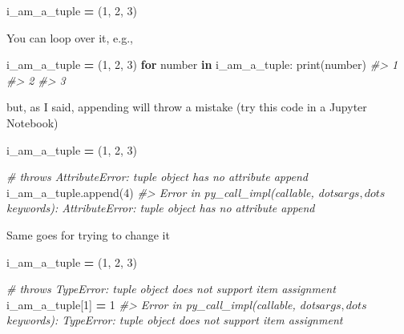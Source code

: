 \documentclass[
]{book}
\newenvironment{Shaded}{\begin{snugshade}}{\end{snugshade}}
\newcommand{\BuiltInTok}[1]{#1}
\newcommand{\CommentTok}[1]{\textcolor[rgb]{0.56,0.35,0.01}{\textit{#1}}}
\newcommand{\ControlFlowTok}[1]{\textcolor[rgb]{0.13,0.29,0.53}{\textbf{#1}}}
\newcommand{\DecValTok}[1]{\textcolor[rgb]{0.00,0.00,0.81}{#1}}
\newcommand{\KeywordTok}[1]{\textcolor[rgb]{0.13,0.29,0.53}{\textbf{#1}}}
\newcommand{\NormalTok}[1]{#1}
\newcommand{\OperatorTok}[1]{\textcolor[rgb]{0.81,0.36,0.00}{\textbf{#1}}}
\begin{document}
\begin{Shaded}
\begin{Highlighting}[]
\NormalTok{i\_am\_a\_tuple }\OperatorTok{=}\NormalTok{ (}\DecValTok{1}\NormalTok{, }\DecValTok{2}\NormalTok{, }\DecValTok{3}\NormalTok{)}
\end{Highlighting}
\end{Shaded}

You can loop over it, e.g.,

\begin{Shaded}
\begin{Highlighting}[]
\NormalTok{i\_am\_a\_tuple }\OperatorTok{=}\NormalTok{ (}\DecValTok{1}\NormalTok{, }\DecValTok{2}\NormalTok{, }\DecValTok{3}\NormalTok{)}
\ControlFlowTok{for}\NormalTok{ number }\KeywordTok{in}\NormalTok{ i\_am\_a\_tuple:}
    \BuiltInTok{print}\NormalTok{(number)}
\CommentTok{\#\textgreater{} 1}
\CommentTok{\#\textgreater{} 2}
\CommentTok{\#\textgreater{} 3}
\end{Highlighting}
\end{Shaded}

but, as I said, appending will throw a mistake (try this code in a Jupyter Notebook)

\begin{Shaded}
\begin{Highlighting}[]
\NormalTok{i\_am\_a\_tuple }\OperatorTok{=}\NormalTok{ (}\DecValTok{1}\NormalTok{, }\DecValTok{2}\NormalTok{, }\DecValTok{3}\NormalTok{)}

\CommentTok{\# throws AttributeError: \textquotesingle{}tuple\textquotesingle{} object has no attribute \textquotesingle{}append\textquotesingle{}}
\NormalTok{i\_am\_a\_tuple.append(}\DecValTok{4}\NormalTok{)}
\CommentTok{\#\textgreater{} Error in py\_call\_impl(callable, dots$args, dots$keywords): AttributeError: \textquotesingle{}tuple\textquotesingle{} object has no attribute \textquotesingle{}append\textquotesingle{}}
\end{Highlighting}
\end{Shaded}

Same goes for trying to change it

\begin{Shaded}
\begin{Highlighting}[]
\NormalTok{i\_am\_a\_tuple }\OperatorTok{=}\NormalTok{ (}\DecValTok{1}\NormalTok{, }\DecValTok{2}\NormalTok{, }\DecValTok{3}\NormalTok{)}

\CommentTok{\# throws TypeError: \textquotesingle{}tuple\textquotesingle{} object does not support item assignment}
\NormalTok{i\_am\_a\_tuple[}\DecValTok{1}\NormalTok{] }\OperatorTok{=} \DecValTok{1} 
\CommentTok{\#\textgreater{} Error in py\_call\_impl(callable, dots$args, dots$keywords): TypeError: \textquotesingle{}tuple\textquotesingle{} object does not support item assignment}
\end{Highlighting}
\end{Shaded}
\end{document}
